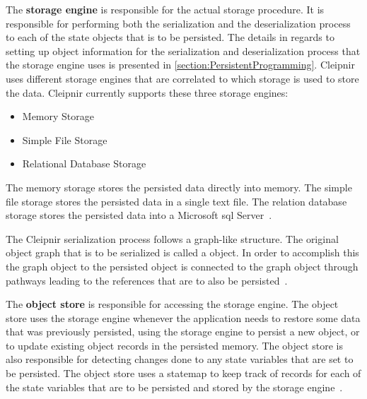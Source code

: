 The \textbf{storage engine} is responsible for the actual storage procedure. It is responsible for performing both the serialization and the deserialization process to each of the state objects that is to be persisted. The details in regards to setting up object information for the serialization and deserialization process that the storage engine uses is presented in \autoref{section:PersistentProgramming}. Cleipnir uses different storage engines that are correlated to which storage is used to store the data. Cleipnir currently supports these three storage engines:
\begin{itemize}
	\item{Memory Storage}
	\item{Simple File Storage}
	\item{Relational Database Storage}
\end{itemize}
\cites[p.~10,12]{PAPER:PaxosCleipnir}

The memory storage stores the persisted data directly into memory.
The simple file storage stores the persisted data in a single text file.
The relation database storage stores the persisted data into a Microsoft \acs{sql} Server~\cites{WEB:MSSQL}[p~10-12]{PAPER:PaxosCleipnir}.

The Cleipnir serialization process follows a graph-like structure. The original object graph that is to be serialized is called a  object. In order to accomplish this the  graph object to the persisted object is connected to the graph object through pathways leading to the references that are to also be persisted~\cite[p.~10]{PAPER:PaxosCleipnir}.


The \textbf{object store} is responsible for accessing the storage engine. The object store uses the storage engine whenever the application needs to restore some data that was previously persisted, using the storage engine to persist a new object, or to update existing object records in the persisted memory. The object store is also responsible for detecting changes done to any state variables that are set to be persisted.
The object store uses a statemap to keep track of records for each of the state variables that are to be persisted and stored by the storage engine~\cite[p.~11]{PAPER:PaxosCleipnir}.

